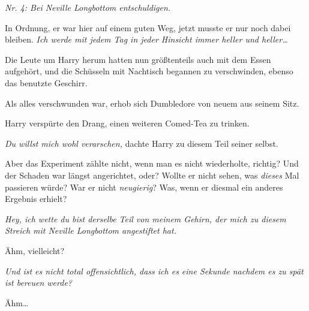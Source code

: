 \emph{Nr. 4: Bei Neville Longbottom entschuldigen.}

In Ordnung, er war hier auf einem guten Weg, jetzt musste er nur noch dabei bleiben. \emph{Ich werde mit jedem Tag in jeder Hinsicht immer heller und heller…}

Die Leute um Harry herum hatten nun größtenteils auch mit dem Essen aufgehört, und die Schüsseln mit Nachtisch begannen zu verschwinden, ebenso das benutzte Geschirr.

Als alles verschwunden war, erhob sich Dumbledore von neuem aus seinem Sitz.

Harry verspürte den Drang, einen weiteren Comed-Tea zu trinken.

\emph{Du \emph{willst} mich wohl verarschen,} dachte Harry zu diesem Teil seiner selbst.

Aber das Experiment zählte nicht, wenn man es nicht wiederholte, richtig? Und der Schaden war längst angerichtet, oder? Wollte er nicht sehen, was \emph{dieses} Mal passieren würde? War er nicht \emph{neugierig}? Was, wenn er diesmal ein anderes Ergebnis erhielt?

\emph{Hey, ich wette du bist derselbe Teil von meinem Gehirn, der mich zu diesem Streich mit Neville Longbottom angestiftet hat.}

Ähm, vielleicht?

\emph{Und ist es nicht total offensichtlich, dass ich es eine Sekunde nachdem es zu spät ist bereuen werde?}

Ähm…

